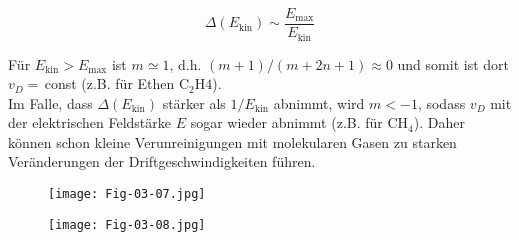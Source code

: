 \[\Delta(E_\text{kin}) \sim \frac{E_\text{max}}{E_\text{kin}}  \]

Für $E_\text{kin}>E_\text{max}$ ist $m\simeq 1$, d.h. $(m+1)/(m+2n+1)\approx 0$ und somit ist dort
$v_D=\,$const (z.B. für Ethen C$_2$H$4$).
\\
Im Falle, dass $\Delta(E_\text{kin})$ stärker als $1/E_\text{kin}$ abnimmt, wird $m<-1$, sodass
$v_D$ mit der elektrischen Feldstärke $E$ sogar wieder abnimmt (z.B. für CH$_4$). Daher können schon
kleine Verunreinigungen mit molekularen Gasen zu starken Veränderungen der Driftgeschwindigkeiten
führen.

\begin{figure}[H]
	\centering
	\texttt{[image: Fig-03-07.jpg]}
\end{figure}

\begin{figure}[H]
	\centering
	\texttt{[image: Fig-03-08.jpg]}
\end{figure}
